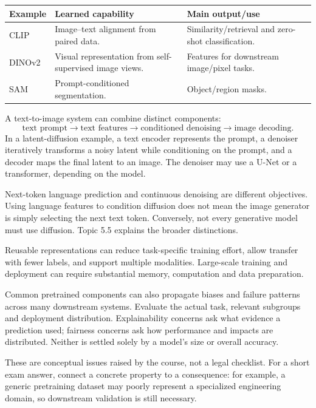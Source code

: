 \documentclass[11pt]{article}
\begin{document}
\begin{longtable}{@{}P{.18\textwidth}P{.32\textwidth}P{.40\textwidth}@{}}
\toprule Example & Learned capability & Main output/use\\\midrule\endhead
CLIP & Image--text alignment from paired data. & Similarity/retrieval and zero-shot classification.\\
DINOv2 & Visual representation from self-supervised image views. & Features for downstream image/pixel tasks.\\
SAM & Prompt-conditioned segmentation. & Object/region masks.\\\bottomrule
\end{longtable}

A text-to-image system can combine distinct components:
\[
\text{text prompt}\longrightarrow\text{text features}
\longrightarrow\text{conditioned denoising}
\longrightarrow\text{image decoding}.
\]
In a latent-diffusion example, a text encoder represents the prompt, a denoiser iteratively transforms a noisy latent while conditioning on the prompt, and a decoder maps the final latent to an image. The denoiser may use a U-Net or a transformer, depending on the model.

Next-token language prediction and continuous denoising are different objectives. Using language features to condition diffusion does not mean the image generator is simply selecting the next text token. Conversely, not every generative model must use diffusion. Topic 5.5 explains the broader distinctions.

Reusable representations can reduce task-specific training effort, allow transfer with fewer labels, and support multiple modalities. Large-scale training and deployment can require substantial memory, computation and data preparation.

Common pretrained components can also propagate biases and failure patterns across many downstream systems. Evaluate the actual task, relevant subgroups and deployment distribution. Explainability concerns ask what evidence a prediction used; fairness concerns ask how performance and impacts are distributed. Neither is settled solely by a model's size or overall accuracy.

These are conceptual issues raised by the course, not a legal checklist. For a short exam answer, connect a concrete property to a consequence: for example, a generic pretraining dataset may poorly represent a specialized engineering domain, so downstream validation is still necessary.
\end{document}

